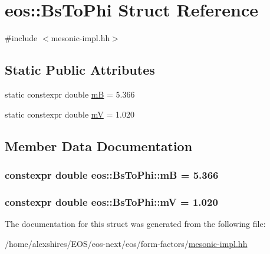 \hypertarget{structeos_1_1BsToPhi}{
\section{eos::BsToPhi Struct Reference}
\label{structeos_1_1BsToPhi}
}


{\ttfamily \#include $<$mesonic-\/impl.hh$>$}\subsection*{Static Public Attributes}
\begin{DoxyCompactItemize}
\item 
static constexpr double \hyperlink{structeos_1_1BsToPhi_a7b5cc22510f449a636fe09bf25280c15}{mB} = 5.366
\item 
static constexpr double \hyperlink{structeos_1_1BsToPhi_a7195e15e3af1c5f2e4c1f34a5ed02a28}{mV} = 1.020
\end{DoxyCompactItemize}


\subsection{Member Data Documentation}
\hypertarget{structeos_1_1BsToPhi_a7b5cc22510f449a636fe09bf25280c15}{
\subsubsection[{mB}]{\setlength{\rightskip}{0pt plus 5cm}constexpr double {\bf eos::BsToPhi::mB} = 5.366}}
\label{structeos_1_1BsToPhi_a7b5cc22510f449a636fe09bf25280c15}
\hypertarget{structeos_1_1BsToPhi_a7195e15e3af1c5f2e4c1f34a5ed02a28}{
\subsubsection[{mV}]{\setlength{\rightskip}{0pt plus 5cm}constexpr double {\bf eos::BsToPhi::mV} = 1.020}}
\label{structeos_1_1BsToPhi_a7195e15e3af1c5f2e4c1f34a5ed02a28}


The documentation for this struct was generated from the following file:\begin{DoxyCompactItemize}
\item 
/home/alexshires/EOS/eos-\/next/eos/form-\/factors/\hyperlink{mesonic-impl_8hh}{mesonic-\/impl.hh}\end{DoxyCompactItemize}
